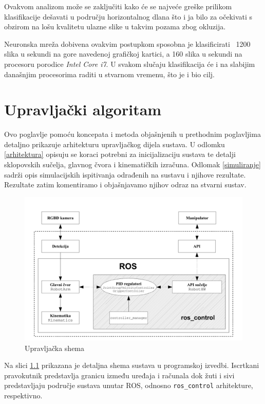 \documentclass[times, utf8, diplomski, numeric]{fer}
\begin{document}
Ovakvom analizom može se zaključiti kako će se najveće greške prilikom klasifikacije dešavati u području horizontalnog dlana što i ja bilo za očekivati s obzirom na lošu kvalitetu ulazne slike u takvim pozama zbog okluzija.

Neuronska mreža dobivena ovakvim postupkom sposobna je klasificirati ~1200 slika u sekundi na gore navedenoj grafičkoj kartici, a 160 slika u sekundi na procesoru porodice \textit{Intel Core i7}. U svakom slučaju klasifikacija će i na slabijim današnjim procesorima raditi u stvarnom vremenu, što je i bio cilj.

\chapter{Upravljački algoritam}\label{Upravljački algoritam}
Ovo poglavlje pomoću koncepata i metoda objašnjenih u prethodnim poglavljima detaljno prikazuje arhitekturu upravljačkog dijela sustava.
U odlomku \ref{arhitektura} opisuju se koraci potrebni za inicijalizaciju sustava te detalji sklopovskih sučelja, glavnog čvora i kinematičkih izračuna.
Odlomak \ref{simuliranje} sadrži opis simulacijskih ispitivanja odrađenih na sustavu i njihove rezultate.
Rezultate zatim komentiramo i objašnjavamo njihov odraz na stvarni sustav.

\begin{figure}[h!]
\centering
\includegraphics[width=\textwidth]{upr_shema}
\caption{Upravljačka shema}\label{upr_shm}
\end{figure}

Na slici \ref{upr_shm} prikazana je detaljna shema sustava u programskoj izvedbi.
Iscrtkani pravokutnik predstavlja granicu između uređaja i računala dok žuti i sivi predstavljaju područje sustava unutar ROS, odnosno \texttt{ros\_control} arhitekture, respektivno.
\end{document}
